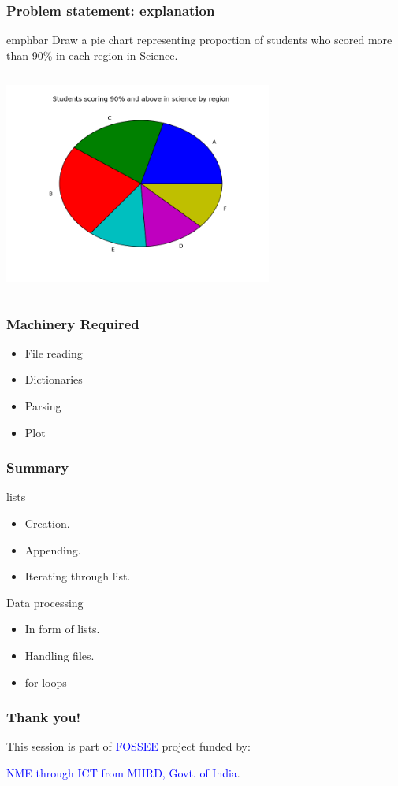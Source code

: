 \documentclass[14pt,compress]{beamer}
\newcommand{\emphbar}[1]
{\begin{beamercolorbox}[rounded=true]{emphbar} 
      {#1}
 \end{beamercolorbox}
}
\begin{document}
\begin{frame}
  \frametitle{Problem statement: explanation}
    \emphbar{Draw a pie chart representing proportion of students who scored more than 90\% in each region in Science.}
    \begin{columns}
    \hspace*{.5in}
    \includegraphics[height=2.6in, interpolate=true]{data/science}
\end{columns}
\end{frame}

\begin{frame}
  \frametitle{Machinery Required}
  \begin{itemize}
    \item File reading 
    \item Dictionaries 
    \item Parsing 
    \item Plot 
  \end{itemize}
\end{frame}

\begin{frame}[fragile]
  \frametitle{Summary}
  \begin{block}{lists}
    \begin{itemize}
    \item Creation.
    \item Appending.
    \item Iterating through list.
    \end{itemize}
  \end{block}
  \begin{block}{Data processing}
    \begin{itemize}
    \item In form of lists.
    \item Handling files.
    \item for loops  
    \end{itemize}  
  \end{block}
\end{frame}

\begin{frame}
  \frametitle{Thank you!}  
  \begin{block}{}
  This session is part of \textcolor{blue}{FOSSEE} project funded by:
  \begin{center}
    \textcolor{blue}{NME through ICT from MHRD, Govt. of India}.
  \end{center}  
  \end{block}
\end{frame}
\end{document}
